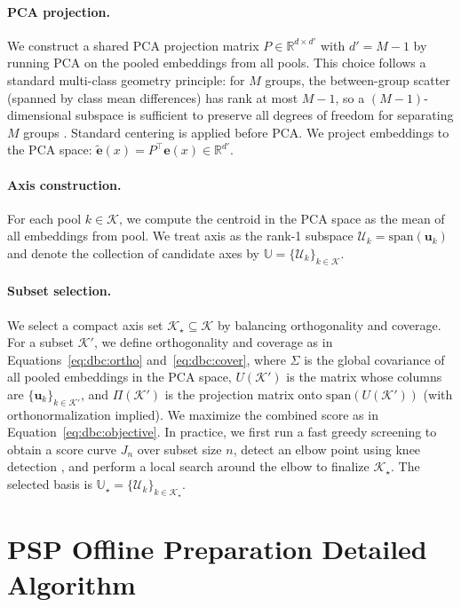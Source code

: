 \paragraph{PCA projection.}
We construct a shared PCA projection matrix $P \in \mathbb{R}^{d \times d'}$ with $d' = M-1$ by running PCA on the pooled embeddings from all pools.
This choice follows a standard multi-class geometry principle: for $M$ groups, the between-group scatter (spanned by class mean differences) has rank at most $M-1$, so a $(M-1)$-dimensional subspace is sufficient to preserve all degrees of freedom for separating $M$ groups \cite{fisher1936use,fukunaga1990spr,hastie2009esl}.
Standard centering is applied before PCA.
We project embeddings to the PCA space: $\tilde{\mathbf{e}}(x) = P^\top \mathbf{e}(x) \in \mathbb{R}^{d'}$.

\paragraph{Axis construction.}
For each pool $k \in \mathcal{K}$, we compute the centroid in the PCA space as the mean of all embeddings from pool.
We treat axis as the rank-1 subspace $\mathcal{U}_k = \mathrm{span}(\mathbf{u}_k)$ and denote the collection of candidate axes by $\mathbb{U} = \{\mathcal{U}_k\}_{k\in\mathcal{K}}$.

\paragraph{Subset selection.}
We select a compact axis set $\mathcal{K}_\star \subseteq \mathcal{K}$ by balancing orthogonality and coverage.
For a subset $\mathcal{K}'$, we define orthogonality and coverage as in Equations~\eqref{eq:dbc:ortho} and~\eqref{eq:dbc:cover}, where $\Sigma$ is the global covariance of all pooled embeddings in the PCA space, $U(\mathcal{K}')$ is the matrix whose columns are $\{\mathbf{u}_k\}_{k\in\mathcal{K}'}$, and $\Pi(\mathcal{K}')$ is the projection matrix onto $\mathrm{span}(U(\mathcal{K}'))$ (with orthonormalization implied).
We maximize the combined score as in Equation~\eqref{eq:dbc:objective}.
In practice, we first run a fast greedy screening to obtain a score curve $J_n$ over subset size $n$, detect an elbow point using knee detection \cite{satopaa2011finding}, and perform a local search around the elbow to finalize $\mathcal{K}_\star$.
The selected basis is $\mathbb{U}_\star = \{\mathcal{U}_k\}_{k\in\mathcal{K}_\star}$.


\section{PSP Offline Preparation Detailed Algorithm}
\label{app:psp_offline_details}

